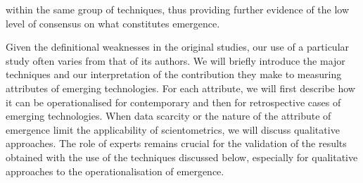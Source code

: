 \documentclass[11pt]{article}
\begin{document}
within the same group of techniques, thus providing further evidence of the low level of consensus on what constitutes emergence. 

Given the definitional weaknesses in the original studies, our use of a particular study often varies from that of its authors. We will briefly introduce the major techniques and our interpretation of the contribution they make to measuring attributes of emerging technologies. For each attribute, we will first describe how it can be operationalised for contemporary and then for retrospective cases of emerging technologies. When data scarcity or the nature of the attribute of emergence limit the applicability of scientometrics, we will discuss qualitative approaches. The role of experts remains crucial for the validation of the results obtained with the use of the techniques discussed below, especially for qualitative approaches to the operationalisation of emergence.
\end{document}
